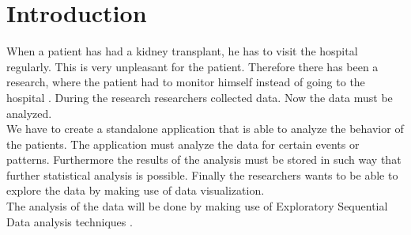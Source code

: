\section{Introduction}
When a patient has had a kidney transplant, he has to visit the hospital regularly. This is very unpleasant for the patient. Therefore there has been a research, where the patient had to monitor himself instead of going to the hospital \cite{Admire} \cite{Admire2}. During the research researchers collected data. Now the data must be analyzed.\\
We have to create a standalone application that is able to analyze the behavior of the patients. The application must analyze the data for certain events or patterns. Furthermore the results of the analysis must be stored in such way that further statistical analysis is possible. Finally the researchers wants to be able to explore the data by making use of data visualization. \\
The analysis of the data will be done by making use of Exploratory Sequential Data analysis techniques \cite{esda}. 
